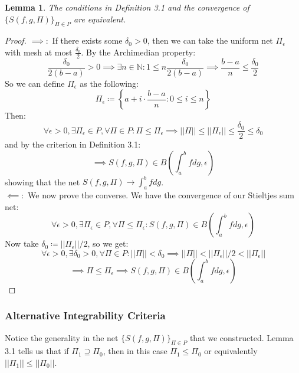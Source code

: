 \documentclass[10pt,letterpaper]{article} %
\newtheorem{lem}{Lemma}[section]
\begin{document}
\begin{lem}
The conditions in Definition 3.1 and the convergence of $\{S(f, g, \Pi)\}_{\Pi \in P}$ are equivalent.
\end{lem}
\begin{proof}
$\implies:$ If there exists some $\delta_0 > 0$, then we can take the uniform net $\Pi_\epsilon$ with mesh at most $\frac{\delta_0}{2}$. By the Archimedian property:
\begin{equation*}
\frac{\delta_0}{2(b-a)} > 0 \implies \exists n \in \mathbb{N}: 1 \leqslant n\frac{\delta_0}{2(b-a)} \implies \frac{b-a}{n} \leqslant \frac{\delta_0}{2} 
\end{equation*}
So we can define $\Pi_\epsilon$ as the following:
\begin{equation*}
\Pi_\epsilon \coloneq \left\{a + i \cdot \frac{b-a}{n} : 0 \leqslant i \leqslant n\right\}
\end{equation*}
Then:
\begin{equation*}
\forall \epsilon > 0, \exists \Pi_\epsilon \in P, \forall \Pi \in P: \Pi \leq \Pi_\epsilon \implies ||\Pi|| \leqslant ||\Pi_\epsilon|| \leqslant \frac{\delta_0}{2} \leqslant \delta_0
\end{equation*}
and by the criterion in Definition 3.1:
\begin{equation*}
\implies S(f, g, \Pi) \in B\left(\int_{a}^{b}fdg, \epsilon\right)
\end{equation*}
showing that the net $S(f, g, \Pi) \xrightarrow{} \int_{a}^{b}fdg$.\\

$\impliedby:$ We now prove the converse. We have the convergence of our Stieltjes sum net:
\begin{equation*}
\forall \epsilon > 0, \exists \Pi_\epsilon \in P, \forall \Pi \leq \Pi_\epsilon: S(f, g, \Pi) \in B\left(\int_{a}^{b}fdg, \epsilon\right)
\end{equation*}
Now take $\delta_0 \coloneq ||\Pi_\epsilon||/2$, so we get:
\begin{equation*}
\forall \epsilon > 0, \exists \delta_0 > 0, \forall \Pi \in P: ||\Pi|| < \delta_0 \implies ||\Pi|| < ||\Pi_\epsilon||/2 < ||\Pi_\epsilon||
\end{equation*}
\begin{equation*}
\implies \Pi \leq \Pi_\epsilon \implies S(f, g, \Pi) \in B\left(\int_{a}^{b}fdg, \epsilon\right)
\end{equation*}
\end{proof}

\subsubsection{Alternative Integrability Criteria}
Notice the generality in the net $\{S(f, g, \Pi)\}_{\Pi \in P}$ that we constructed. Lemma 3.1 tells us that if $\Pi_1 \supseteq \Pi_0$, then in this case $\Pi_1 \leq \Pi_0$ or equivalently $||\Pi_1|| \leqslant ||\Pi_0||$.\\
\end{document}
